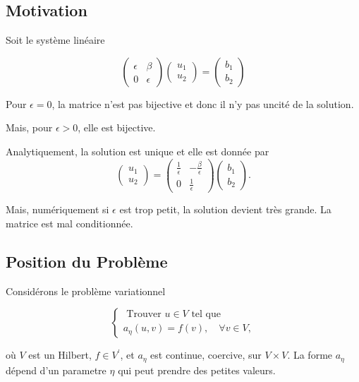 \subsection{Motivation}

Soit le système linéaire 

$$
\left(\begin{matrix}
\epsilon&\beta\\
0&\epsilon
\end{matrix}
\right)\left( \begin{matrix}
u_1\\u_2
\end{matrix}\right)= \left( \begin{matrix}
b_1\\b_2
\end{matrix}\right)
$$

Pour $\epsilon=0$, la matrice n'est pas bijective et donc il n'y pas uncité de la solution. 

Mais, pour $\epsilon>0$, elle est bijective.  

Analytiquement, la solution  est unique  et elle est donnée par 
$$
\left( \begin{matrix}
	u_1\\u_2
\end{matrix}\right)= \left(\begin{matrix}
\frac1{\epsilon}&-\frac{\beta}{\epsilon}\\
0&\frac1{\epsilon}
\end{matrix}
\right) \left( \begin{matrix}
	b_1\\b_2
\end{matrix}\right).
$$

Mais, numériquement si $\epsilon$ est trop petit, la solution devient très grande.  La  matrice est mal conditionnée.  

\subsection{Position du Problème}

Considérons le problème  variationnel 

$$
\left\{\begin{array}{l}
	\text { Trouver } u \in V \text { tel que } \\
	a_{\eta}(u, v)=f(v), \quad \forall v \in V,
\end{array}\right.
$$

où  $V$ est un  Hilbert, $f \in V^{\prime}$,  et  $a_{\eta}$ est continue, coercive, sur  $V \times V$. La forme $a_{\eta}$ dépend d'un parametre    $\eta$ qui peut prendre des petites valeurs. 

